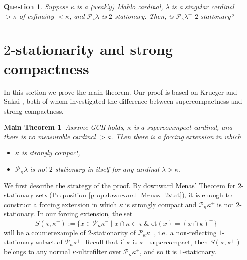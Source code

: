 \documentclass[a4paper,12pt,reqno,oneside]{amsart}
\theoremstyle{plain}
\newtheorem{question}[theorem]{Question}
\newtheorem*{mthm}{Main Theorem}
\newcommand{\otp}{\mathrm{ot}}
\newcommand{\mcal}{\mathcal}
\begin{document}
\begin{question}
Suppose $\kappa$ is a (weakly) Mahlo cardinal, $\lambda$ is a singular cardinal $> \kappa$ of cofinality $< \kappa$, and $\mcal{P}_\kappa \lambda$ is $2$-stationary. Then, is $\mcal{P}_\kappa \lambda^+$ $2$-stationary?
\end{question}


\section{$2$-stationarity and strong compactness} \label{sec:2stat_stcmpct}

In this section we prove the main theorem. Our proof is based on Krueger \cite{Kr} and Sakai \cite{S}, both of whom investigated the difference between supercompactness and strong compactness.

\begin{mthm}
Assume GCH holds, $\kappa$ is a supercommpact cardinal, and there is no measurable cardinal $> \kappa$. Then there is a forcing extension in which
\begin{itemize}
\item[(I)] $\kappa$ is strongly compact,
\item[(II)] $\mcal{P}_\kappa \lambda$ is not $2$-stationary in itself for any cardinal $\lambda > \kappa$.
\end{itemize}
\end{mthm}

We first describe the strategy of the proof. By downward Menas' Theorem for $2$-stationary sets (Proposition \ref{prop:downward_Menas_2stat}), it is enough to construct a forcing extension in which $\kappa$ is strongly compact and $\mcal{P}_\kappa \kappa^+$ is not $2$-stationary. In our forcing extension, the set
\[
S( \kappa , \kappa^+ ) := \{ x \in \mcal{P}_\kappa \kappa^+ \mid x \cap \kappa \in \kappa \;\&\; \otp (x) = ( x \cap \kappa )^+ \}
\]
will be a counterexample of $2$-stationarity of $\mcal{P}_\kappa \kappa^+$, i.e.~a non-reflecting $1$-stationary subset of $\mcal{P}_\kappa \kappa^+$. Recall that if $\kappa$ is $\kappa^+$-supercompact, then $S( \kappa , \kappa^+ )$ belongs to any normal $\kappa$-ultrafilter over $\mcal{P}_\kappa \kappa^+$, and so it is $1$-stationary.
\end{document}
